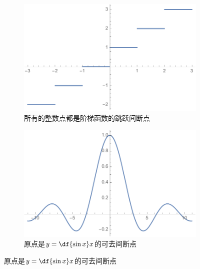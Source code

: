 \begin{figure}[h]
	\centering
	\begin{subfigure}[t]{.45\textwidth}
		\centering
		\includegraphics[width=\textwidth]{./Images/Ch01/roundx.pdf}
		\caption{所有的整数点都是阶梯函数的跳跃间断点}	
	\end{subfigure}
	\begin{subfigure}[t]{.45\textwidth}
		\centering
		\includegraphics[width=\textwidth]{./Images/Ch01/sinxox.pdf}
		\caption{原点是$y=\df{\sin x}x$的可去间断点}	
	\end{subfigure}


\end{figure}
